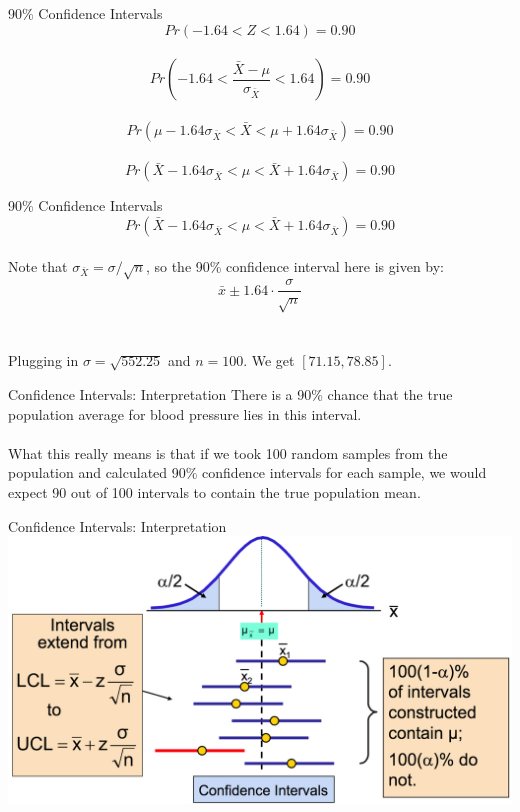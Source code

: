 \documentclass{./../div_teaching_slides}
\begin{document}
\begin{frame}{90\% Confidence Intervals}
 $$ Pr(-1.64 < Z < 1.64) = 0.90 $$ \\
 $$ Pr\left(-1.64 < \frac{\bar{X}-\mu}{\sigma_{\bar{X}}} < 1.64 \right) = 0.90 $$ \\
   $$ Pr\left( \mu -1.64 \sigma_{\bar{X}} < \bar{X}<   \mu+  1.64 \sigma_{\bar{X}} \right) = 0.90 $$ \\
  $$ Pr\left( \bar{X} -1.64 \sigma_{\bar{X}} < \mu <   \bar{X}+  1.64 \sigma_{\bar{X}} \right) = 0.90 $$
\end{frame}

\begin{frame}{90\% Confidence Intervals}
$$ Pr\left( \bar{X} -1.64 \sigma_{\bar{X}} < \mu <   \bar{X}+  1.64 \sigma_{\bar{X}} \right) = 0.90 $$ \\ \vspace{1em}
 Note that $\sigma_{\bar{X}}=\sigma/\sqrt{n}$, so the 90\% confidence interval here is given by:
 $$ \bar{x} \pm 1.64\cdot   \frac{\sigma}{\sqrt{n}} $$ \\~\\
 Plugging in $\sigma = \sqrt{552.25}$ and $n=100$. We get $[71.15, 78.85]$. 
\end{frame}

\begin{frame}{Confidence Intervals: Interpretation}
\vfill
There is a 90\% chance that the true population average for blood pressure lies in this interval. \\~\\

What this really means is that if we took 100 random samples from the population and calculated 90\% confidence intervals for each sample, we would expect 90 out of 100 intervals to contain the true population mean.
\vfill
\end{frame}

\begin{frame}{Confidence Intervals: Interpretation}
\centering
\includegraphics[scale=0.5]{ci_int.png}	
\end{frame}
\end{document}
